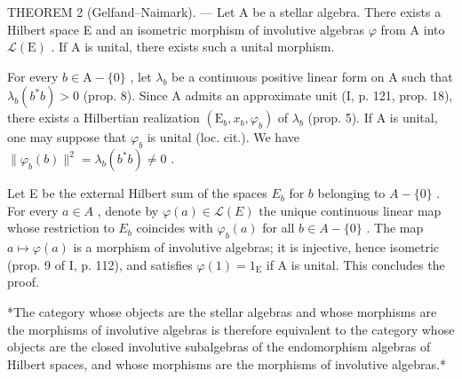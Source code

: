 THEOREM 2 (Gelfand--Naimark). --- Let A be a stellar algebra. There exists a Hilbert space E and an isometric morphism of involutive algebras \(\varphi\) from A into \(\mathcal{L}(\mathrm{E})\) . If A is unital, there exists such a unital morphism.

For every \(b \in \mathrm{A} - \{0\}\) , let \(\lambda_b\) be a continuous positive linear form on A such that \(\lambda_b(b^*b) > 0\) (prop. 8). Since A admits an approximate unit (I, p. 121, prop. 18), there exists a Hilbertian realization \((\mathrm{E}_b, x_b, \varphi_b)\) of \(\lambda_b\) (prop. 5). If A is unital, one may suppose that \(\varphi_b\) is unital (loc. cit.). We have \(\| \varphi_b(b) \|^2 = \lambda_b(b^*b) \neq 0\) .

Let E be the external Hilbert sum of the spaces \(E_{b}\) for \(b\) belonging to \(A - \{0\}\) . For every \(a \in A\) , denote by \(\varphi(a) \in \mathcal{L}(E)\) the unique continuous linear map whose restriction to \(E_{b}\) coincides with \(\varphi_{b}(a)\) for all \(b \in A - \{0\}\) . The map \(a \mapsto \varphi(a)\) is a morphism of involutive algebras; it is injective, hence isometric (prop. 9 of I, p. 112), and satisfies \(\varphi(1) = 1_{\mathrm{E}}\) if A is unital. This concludes the proof.

*The category whose objects are the stellar algebras and whose morphisms are the morphisms of involutive algebras is therefore equivalent to the category whose objects are the closed involutive subalgebras of the endomorphism algebras of Hilbert spaces, and whose morphisms are the morphisms of involutive algebras.*

